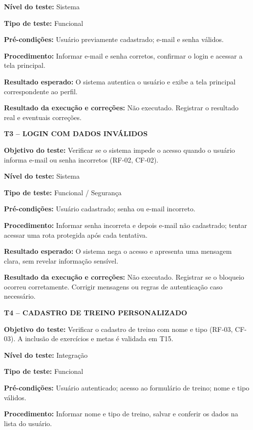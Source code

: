 \noindent\textbf{Nível do teste:} Sistema

\noindent\textbf{Tipo de teste:} Funcional

\noindent\textbf{Pré-condições:} Usuário previamente cadastrado; e-mail e senha válidos.

\noindent\textbf{Procedimento:} Informar e-mail e senha corretos, confirmar o login e acessar a tela principal.

\noindent\textbf{Resultado esperado:} O sistema autentica o usuário e exibe a tela principal correspondente ao perfil.

\noindent\textbf{Resultado da execução e correções:} Não executado. Registrar o resultado real e eventuais correções.

\textbf{T3 -- LOGIN COM DADOS INVÁLIDOS}

\noindent\textbf{Objetivo do teste:} Verificar se o sistema impede o acesso quando o usuário informa e-mail ou senha incorretos (RF-02, CF-02).

\noindent\textbf{Nível do teste:} Sistema

\noindent\textbf{Tipo de teste:} Funcional / Segurança

\noindent\textbf{Pré-condições:} Usuário cadastrado; senha ou e-mail incorreto.

\noindent\textbf{Procedimento:} Informar senha incorreta e depois e-mail não cadastrado; tentar acessar uma rota protegida após cada tentativa.

\noindent\textbf{Resultado esperado:} O sistema nega o acesso e apresenta uma mensagem clara, sem revelar informação sensível.

\noindent\textbf{Resultado da execução e correções:} Não executado. Registrar se o bloqueio ocorreu corretamente. Corrigir mensagens ou regras de autenticação caso necessário.

\textbf{T4 -- CADASTRO DE TREINO PERSONALIZADO}

\noindent\textbf{Objetivo do teste:} Verificar o cadastro de treino com nome e tipo (RF-03, CF-03). A inclusão de exercícios e metas é validada em T15.

\noindent\textbf{Nível do teste:} Integração

\noindent\textbf{Tipo de teste:} Funcional

\noindent\textbf{Pré-condições:} Usuário autenticado; acesso ao formulário de treino; nome e tipo válidos.

\noindent\textbf{Procedimento:} Informar nome e tipo de treino, salvar e conferir os dados na lista do usuário.

